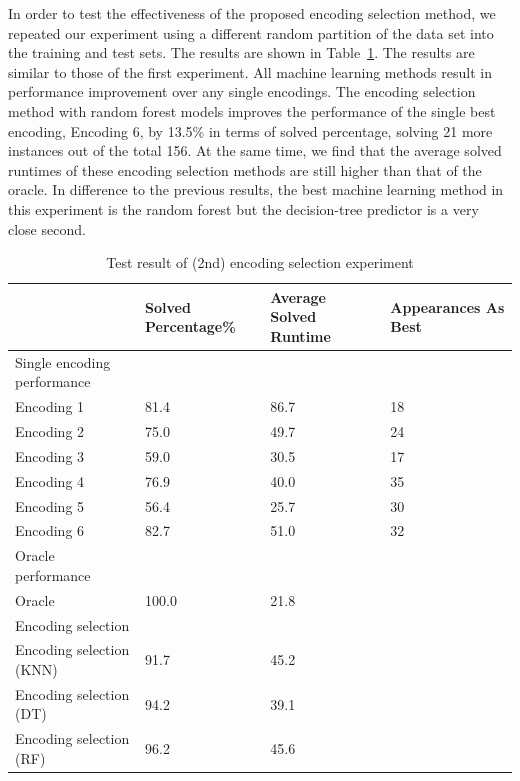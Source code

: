 \documentclass{new_tlp}
\begin{document}
In order to test the effectiveness of the proposed encoding selection method, 
we repeated our experiment using a different random partition of the data set 
into the training and test sets. The results are shown in Table~\ref{ecresult2}.
The results are similar to those of the first experiment. All machine learning 
methods result in performance improvement over any single encodings. The 
encoding selection method with random forest models improves the performance 
of the single best encoding, Encoding 6, by 13.5\% in terms of solved 
percentage, solving 21 more instances out of the total 156. At the same time, 
we find that the average solved runtimes of these encoding selection methods 
are still higher than that of the oracle. In difference to the previous results,
the best machine learning method in this experiment is the random forest but 
the decision-tree predictor is a very close second. 

\begin{table}[]
	\caption{Test result of (2nd) encoding selection experiment} \label{ecresult2}
	\programmath
	\begin{tabular}{llll}
		\hline\hline
		& Solved Percentage\% & Average Solved Runtime & Appearances As Best \\ \hline%
		Single encoding performance & & &                                     \\ %
		Encoding 1        & 81.4&86.7                      & 18            \\ %
		Encoding 2        & 75.0 & 49.7                      & 24            \\ %
		Encoding 3        & 59.0&30.5                       & 17            \\ %
		Encoding 4        & 76.9&40.0                      & 35            \\ %
		Encoding 5        & 56.4&25.7                      & 30            \\ %
		Encoding 6        & 82.7&51.0                      & 32            \\\hline %
		Oracle performance  & & &                                               \\ %
		Oracle            & 100.0           & 21.8                      &               \\ \hline
		Encoding selection & & &                                                \\ %
		Encoding selection (KNN) & 91.7&45.2                    &               \\ %
		Encoding selection (DT) & 94.2&39.1      &               \\ %
		Encoding selection (RF) & 96.2&45.6	      &               \\ %
		\hline\hline
	\end{tabular}
	\programmath
\end{table}
\end{document}
